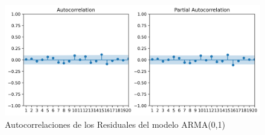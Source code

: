 \documentclass{article}
\theoremstyle{remark}
\theoremstyle{definition}
\begin{document}
\begin{enumerate}[label = \emph{\alph*})]
\begin{tcolorbox}[title=Soluci\'on 2.e]
\begin{figure}[H]
                \label{fig:residuales}
            \end{figure}
             \begin{figure}[H]
                \centering
                \includegraphics[width=0.9\linewidth]{output/acf_pacf_residuales.png}
                \caption{Autocorrelaciones de los Residuales del modelo ARMA(0,1)}
                \label{fig:corr_resid}
            \end{figure}

            
            

\end{tcolorbox}
\end{enumerate}
\end{document}
